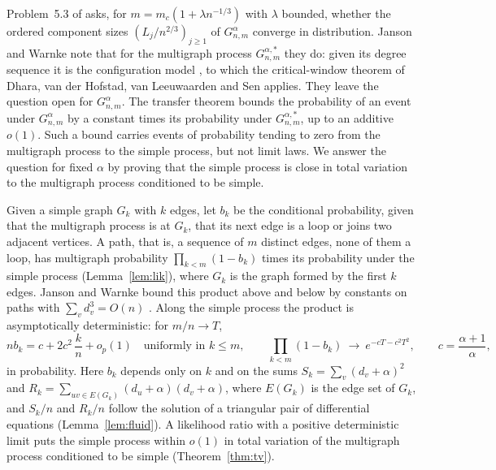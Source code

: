 \documentclass[11pt]{amsart}
\theoremstyle{remark}
\numberwithin{equation}{section}
\begin{document}
Problem~5.3 of \cite{JW21} asks, for $m=m_c(1+\lambda n^{-1/3})$ with $\lambda$ bounded, whether the ordered component sizes $(L_j/n^{2/3})_{j\ge1}$ of $G^\alpha_{n,m}$ converge in distribution. Janson and Warnke note that for the multigraph process $G^{\alpha,*}_{n,m}$ they do: given its degree sequence it is the configuration model \cite[Theorem~2.4]{JW21}, to which the critical-window theorem of Dhara, van der Hofstad, van Leeuwaarden and Sen \cite{DHLS17} applies. They leave the question open for $G^\alpha_{n,m}$. The transfer theorem \cite[Theorem~2.2]{JW21} bounds the probability of an event under $G^\alpha_{n,m}$ by a constant times its probability under $G^{\alpha,*}_{n,m}$, up to an additive $o(1)$. Such a bound carries events of probability tending to zero from the multigraph process to the simple process, but not limit laws. We answer the question for fixed $\alpha$ by proving that the simple process is close in total variation to the multigraph process conditioned to be simple.

Given a simple graph $G_k$ with $k$ edges, let $b_k$ be the conditional probability, given that the multigraph process is at $G_k$, that its next edge is a loop or joins two adjacent vertices. A path, that is, a sequence of $m$ distinct edges, none of them a loop, has multigraph probability $\prod_{k<m}(1-b_k)$ times its probability under the simple process (Lemma~\ref{lem:lik}), where $G_k$ is the graph formed by the first $k$ edges. Janson and Warnke bound this product above and below by constants on paths with $\sum_v d_v^3=O(n)$ \cite[Lemma~3.3]{JW21}. Along the simple process the product is asymptotically deterministic: for $m/n\to T$,
\[
nb_k=c+2c^2\,\frac kn+o_p(1)\quad\text{uniformly in }k\le m,
\qquad
\prod_{k<m}(1-b_k)\ \to\ e^{-cT-c^2T^2},
\qquad c=\frac{\alpha+1}{\alpha},
\]
in probability. Here $b_k$ depends only on $k$ and on the sums $S_k=\sum_v(d_v+\alpha)^2$ and $R_k=\sum_{uv\in E(G_k)}(d_u+\alpha)(d_v+\alpha)$, where $E(G_k)$ is the edge set of $G_k$, and $S_k/n$ and $R_k/n$ follow the solution of a triangular pair of differential equations (Lemma~\ref{lem:fluid}). A likelihood ratio with a positive deterministic limit puts the simple process within $o(1)$ in total variation of the multigraph process conditioned to be simple (Theorem~\ref{thm:tv}).
\end{document}
